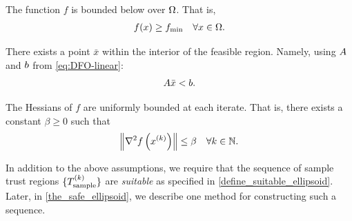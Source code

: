 \documentclass{article}
\begin{document}



\begin{assumption}
\label{lower_bound}
The function $f$ is bounded below over $\Omega$.
That is,
\begin{align}
f(x) \ge f_{\text{min}} \quad \forall x \in \Omega.
\end{align}
\end{assumption}

\begin{assumption}
\label{interior_point}
There exists a point $\bar x$ within the interior of the feasible region.
Namely, using ${A}$ and ${b}$ from \cref{eq:DFO-linear}:
\begin{align}
{A} \bar x < {b}.
\end{align}
\end{assumption}


\begin{assumption}
\label{uniformly_bounded_hessians_of_f}
The Hessians of $f$ are uniformly bounded at each iterate. That is, there exists a constant $\beta \ge 0$ such that
\begin{align*}
\left\|\nabla^2 f\left(x^{(k)}\right)\right\| \le \beta \quad \forall k \in \mathbb N.
\end{align*}
\end{assumption}

In addition to the above assumptions,  we require that the sequence of sample trust regions $\{{T_{\text{sample}}^{(k)}}\}$ are \emph{suitable} as specified in \cref{define_suitable_ellipsoid}.   
  Later, in \cref{the_safe_ellipsoid}, we describe one method for constructing such a sequence.


\end{document}
